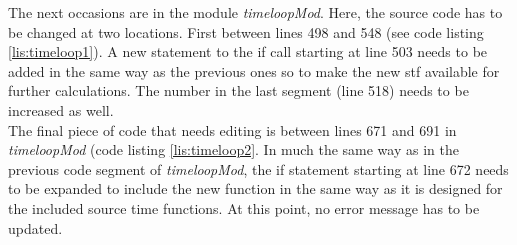     The next occasions are in the module \emph{timeloopMod}. Here, the source code has to be changed at two locations. First between lines 498 and 548 (see code listing \ref{lis:timeloop1}). A new statement to the if call starting at line 503 needs to be added in the same way as the previous ones so to make the new stf available for further calculations. The number in the last segment (line 518) needs to be increased as well. \\
    
 	The final piece of code that needs editing is between lines 671 and 691 in \emph{timeloopMod} (code listing \ref{lis:timeloop2}. In much the same way as in the previous code segment of \emph{timeloopMod}, the if statement starting at line 672 needs to be expanded to include the new function in the same way as it is designed for the included source time functions. At this point, no error message has to be updated. 
 	